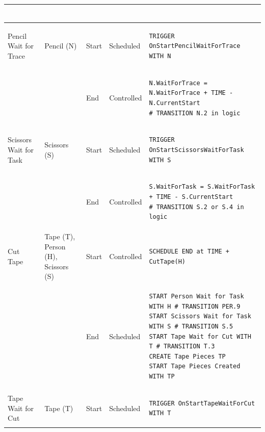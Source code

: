 \documentclass[
  10pt,
  a4paperpaper,
  DIV=11,
  numbers=noendperiod,
  oneside]{scrreprt}
\begin{document}
\begin{longtable}{@{}>{\raggedright\arraybackslash}p{1.8cm}>{\raggedright\arraybackslash}p{2.1cm}>{\raggedright\arraybackslash}p{0.9cm}>{\raggedright\arraybackslash}p{2.2cm}>{\raggedright\arraybackslash}p{8.75cm}@{}}
\begin{lstlisting}[language=CMPseudo]
\end{lstlisting}              \\ \midrule
  Pencil Wait for Trace    & Pencil (N)                             & Start & Scheduled  & 
\begin{lstlisting}[language=CMPseudo]
TRIGGER OnStartPencilWaitForTrace WITH N
\end{lstlisting}             \\
  &                                                          & End   & Controlled & 
\begin{lstlisting}[language=CMPseudo]
N.WaitForTrace = N.WaitForTrace + TIME - N.CurrentStart
# TRANSITION N.2 in logic
\end{lstlisting}             \\ \midrule
  Scissors Wait for Task    & Scissors (S)                            & Start & Scheduled  & 
\begin{lstlisting}[language=CMPseudo]
TRIGGER OnStartScissorsWaitForTask WITH S
\end{lstlisting}             \\
  &                                                          & End   & Controlled & 
\begin{lstlisting}[language=CMPseudo]
S.WaitForTask = S.WaitForTask + TIME - S.CurrentStart
# TRANSITION S.2 or S.4 in logic
\end{lstlisting}             \\ \midrule
  Cut Tape                  & Tape (T), Person (H), Scissors (S)      & Start & Controlled  & 
\begin{lstlisting}[language=CMPseudo]
SCHEDULE END at TIME + CutTape(H)
\end{lstlisting}             \\
  &                                                          & End   & Scheduled & 
\begin{lstlisting}[language=CMPseudo]
START Person Wait for Task WITH H # TRANSITION PER.9
START Scissors Wait for Task WITH S # TRANSITION S.5
START Tape Wait for Cut WITH T # TRANSITION T.3
CREATE Tape Pieces TP
START Tape Pieces Created WITH TP
\end{lstlisting}             \\ \midrule
  Tape Wait for Cut         & Tape (T)                                & Start & Scheduled  & 
\begin{lstlisting}[language=CMPseudo]
TRIGGER OnStartTapeWaitForCut WITH T
\end{lstlisting}             \\

\end{longtable}
\end{document}
